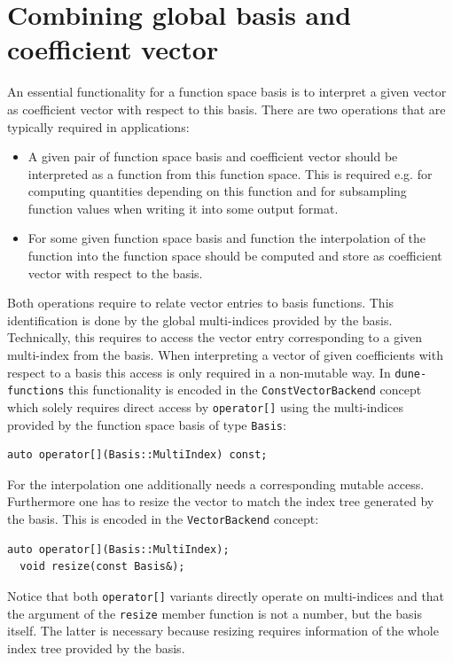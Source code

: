 \documentclass[a4paper,10pt,headings=normal,bibliography=totoc]{scrartcl}
\newcommand{\cpp}[1]{\lstinline[basicstyle=\ttfamily]!#1!}
\newcommand{\dunemodule}[1]{\texttt{#1}}
\begin{document}
\section{Combining global basis and coefficient vector}
An essential functionality for a function space basis is to interpret
a given vector as coefficient vector with respect to this
basis. There are two operations that are typically required
in applications:

\begin{itemize}
  \item
    A given pair of function space basis and coefficient vector
    should be interpreted as a function from this function space.
    This is required e.g. for computing quantities depending on
    this function and for subsampling function values
    when writing it into some output format.
  \item
    For some given function space basis and function
    the interpolation of the function into the function
    space should be computed and store as coefficient vector
    with respect to the basis.
\end{itemize}

Both operations require to relate vector entries to basis functions.
This identification is done by the global multi-indices provided
by the basis. Technically, this requires to access the vector
entry corresponding to a given multi-index from the basis.
When interpreting a vector of given coefficients with respect
to a basis this access is only required in a non-mutable way.
In \dunemodule{dune-functions}
this functionality is encoded in the \cpp{ConstVectorBackend} concept which
solely requires direct access by \cpp{operator[]} using the multi-indices
provided by the function space basis of type \cpp{Basis}:
\begin{lstlisting}[style=Interface]
  auto operator[](Basis::MultiIndex) const;
\end{lstlisting}

For the interpolation one additionally needs a corresponding mutable
access. Furthermore one has to resize the vector to match
the index tree generated by the basis. This is encoded in the
\cpp{VectorBackend} concept:
\begin{lstlisting}[style=Interface]
  auto operator[](Basis::MultiIndex);
  void resize(const Basis&);
\end{lstlisting}

Notice that both \cpp{operator[]} variants directly operate
on multi-indices and that the argument of the \cpp{resize}
member function is not a number, but the basis itself. The latter
is necessary because resizing requires information of the whole
index tree provided by the basis.
\end{document}
